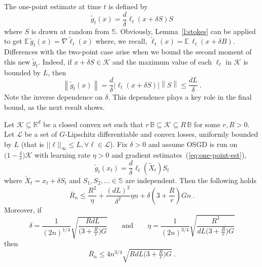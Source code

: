\documentclass[11pt]{hackednow}
\newcommand{\E}{\mathbb{E}}
\newcommand{\R}{\mathbb{R}}
\newcommand{\cL}{\mathcal{L}}
\newcommand{\cK}{\mathcal{K}}
\newcommand{\oR}{\overline{R}}
\newcommand{\dt}{\displaystyle}
\newcommand{\Ball}{\mathbb{B}}
\newcommand{\Sphere}{\mathbb{S}}
\newcommand{\norm}[1]{\left\|{#1}\right\|}
\newcommand{\tX}{\widetilde{X}}
\newcommand{\tloss}{\widetilde{\ell}}
\newcommand{\gtilde}{\widetilde{g}}
\begin{document}
The one-point estimate at time $t$ is defined by
\begin{equation}
\label{eq:one-point-est}
    \gtilde_t(x) = \frac{d}{\delta}\ell_t(x + \delta S)S
\end{equation}
where $S$ is drawn at random from $\Sphere$. Obviously, Lemma~\ref{l:stokes} can be applied to get
$
    \E\,\gtilde_t(x) = \nabla\tloss_t(x)
$
where, we recall, $\tloss_t(x) = \E\,\ell_t(x + \delta B)$. Differences with the two-point case arise when we bound the second moment of this new $\gtilde_t$. Indeed, if $x + \delta S \in \cK$ and the maximum value of each $\ell_t$ in $\cK$ is bounded by $L$, then
\[
    \norm{\gtilde_t(x)}
=
    \frac{d}{\delta}\bigl|\ell_t(x + \delta S)\bigr|\norm{S}
\le
    \frac{dL}{\delta}~.
\]
Note the inverse dependence on $\delta$. This dependence plays a key role in the final bound, as the next result shows.
\begin{theorem}
Let $\cK\subseteq\R^d$ be a closed convex set such that $r\,\Ball\subseteq\cK\subseteq R\,\Ball$ for some $r,R > 0$. 
%
Let $\cL$ be a set of $G$-Lipschitz differentiable and convex losses, uniformly bounded by $L$ (that is $||\ell||_{\infty} \leq L, \forall \ell \in \cL$). 
%
Fix $\delta > 0$ and assume OSGD is run on $\bigl(1-\tfrac{\delta}{r}\bigr)\cK$ with learning rate $\eta > 0$ and gradient estimates~(\ref{eq:one-point-est}),
\[
    \gtilde_t(x_t) = \frac{d}{\delta}\ell_t(\tX_t)S_t
\]
where $\tX_t = x_t + \delta S_t$ and $S_1,S_2,\dots\in\Sphere$ are independent. 
Then
the following holds
\[
\oR_n
\le
    \frac{R^2}{\eta} + \frac{(dL)^2}{\delta^2}\eta n + \delta\left(3 + \frac{R}{r} \right) G n~.
\]
Moreover, if
\[
    \delta = \frac{1}{(2n)^{1/4}}\sqrt{\frac{RdL}{\bigl(3 + \tfrac{R}{r} \bigr)G}}
\qquad\text{and}\qquad
    \eta = \frac{1}{(2n)^{3/4}}\sqrt{\frac{R^3}{dL\bigl(3 + \tfrac{R}{r} \bigr)G}}
\]
then
\[
\oR_n
\le
    4 n^{3/4}\sqrt{RdL\bigl(3 + \tfrac{R}{r} \bigr)G}~.
\]
\end{theorem}
%
\end{document}
